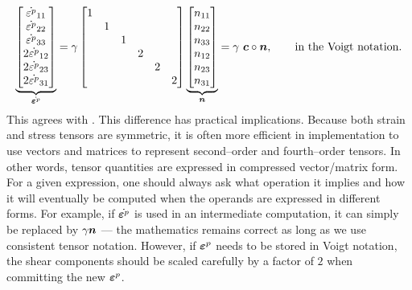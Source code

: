 \begin{gather}
    \underbrace{\begin{bmatrix}
            \dot{\varepsilon^p}_{11}  \\
            \dot{\varepsilon^p}_{22}  \\
            \dot{\varepsilon^p}_{33}  \\
            2\dot{\varepsilon^p}_{12} \\
            2\dot{\varepsilon^p}_{23} \\
            2\dot{\varepsilon^p}_{31}
        \end{bmatrix}}_{\dot{\bm{\varepsilon}^p}}
    =
    \gamma\begin{bmatrix}
        1 &   &   &   &   &   \\
          & 1 &   &   &   &   \\
          &   & 1 &   &   &   \\
          &   &   & 2 &   &   \\
          &   &   &   & 2 &   \\
          &   &   &   &   & 2
    \end{bmatrix}
    \underbrace{
        \begin{bmatrix}
            n_{11} \\
            n_{22} \\
            n_{33} \\
            n_{12} \\
            n_{23} \\
            n_{31}
        \end{bmatrix}}_{\bm{n}}=\gamma~\bm{c}\circ\bm{n},\qquad\text{in the Voigt notation.}
\end{gather}
This agrees with .
This difference has practical implications.
Because both strain and stress tensors are symmetric, it is often more efficient in implementation to use vectors and matrices to represent second--order and fourth--order tensors.
In other words, tensor quantities are expressed in compressed vector/matrix form.
For a given expression, one should always ask what operation it implies and how it will eventually be computed when the operands are expressed in different forms.
For example, if $\dot{\bm{\varepsilon}^p}$ is used in an intermediate computation, it can simply be replaced by $\gamma\bm{n}$ --- the mathematics remains correct as long as we use consistent tensor notation.
However, if $\bm{\varepsilon}^p$ needs to be stored in Voigt notation, the shear components should be scaled carefully by a factor of $2$ when committing the new $\bm{\varepsilon}^p$.

